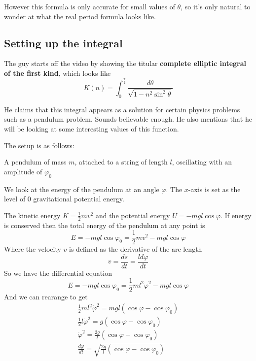 \documentclass[11pt]{article}
\begin{document}
\vspace{5mm}However this formula is only accurate for small values of $\theta$, so it's only natural to wonder at what the real period formula looks like.

\subsection{Setting up the integral}
The guy starts off the video by showing the titular \textbf{complete elliptic integral of the first kind}, which looks like
$$K(n)=\int_0^{\frac{\pi}{2}}\frac{d\theta}{\sqrt{1-n^2\sin^2\theta}}$$

He claims that this integral appears as a solution for certain physics problems such as a pendulum problem. Sounds believable enough. He also mentions that he will be looking at some interesting values of this function.

\vspace{5mm} The setup is as follows:

\begin{center}
\end{center}

A pendulum of mass $m$, attached to a string of length $l$, oscillating with an amplitude of $\varphi_0$

\vspace{5mm} We look at the energy of the pendulum at an angle $\varphi$. The $x$-axis is set as the level of $0$ gravitational potential energy. 

\vspace{5mm}The kinetic energy $K=\frac{1}{2}mv^2$ and the potential energy $U=-mgl\cos\varphi$. If energy is conserved then the total energy of the pendulum at any point is
$$E=-mgl\cos\varphi_0=\frac{1}{2}mv^2-mgl\cos\varphi$$
Where the velocity $v$ is defined as the derivative of the arc length 
$$v=\frac{ds}{dt}=\frac{ld\varphi}{dt}$$
So we have the differential equation
$$E=-mgl\cos\varphi_0=\frac{1}{2}ml^2\dot\varphi^2-mgl\cos\varphi$$
And we can rearange to get
\begin{gather*}
\frac{1}{2}ml^2\dot\varphi^2=mgl(\cos\varphi-\cos\varphi_0) \\
\frac{1}{2}l\dot\varphi^2=g(\cos\varphi-\cos\varphi_0) \\
\dot\varphi^2=\frac{2g}{l}(\cos\varphi-\cos\varphi_0) \\
\frac{d\varphi}{dt}=\sqrt{\frac{2g}{l}(\cos\varphi-\cos\varphi_0)}
\end{gather*}
\end{document}
